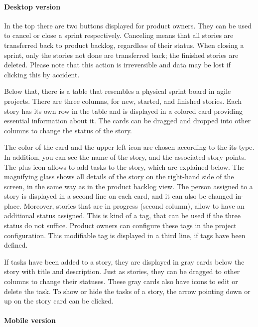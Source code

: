 \documentclass[
	accentcolor=tud1a %
]{tudreport}
\begin{document}
\paragraph{Desktop version}
In the top there are two buttons displayed for product owners. They can be used to cancel or close a sprint respectively. Canceling means that all stories are transferred back to product backlog, regardless of their status. When closing a sprint, only the stories not done are transferred back; the finished stories are deleted. Please note that this action is irreversible and data may be lost if clicking this by accident.

Below that, there is a table that resembles a physical sprint board in agile projects. There are three columns, for new, started, and finished stories. Each story has its own row in the table and is displayed in a colored card providing essential information about it. The cards can be dragged and dropped into other columns to change the status of the story.

The color of the card and the upper left icon are chosen according to the its type. In addition, you can see the name of the story, and the associated story points. The plus icon allows to add tasks to the story, which are explained below. The magnifying glass shows all details of the story on the right-hand side of the screen, in the same way as in the product backlog view. The person assigned to a story is displayed in a second line on each card, and it can also be changed in-place. Moreover, stories that are in progress (second column), allow to have an additional status assigned. This is kind of a tag, that can be used if the three status do not suffice. Product owners can configure these tags in the project configuration. This modifiable tag is displayed in a third line, if tags have been defined.

If tasks have been added to a story, they are displayed in gray cards below the story with title and description. Just as stories, they can be dragged to other columns to change their statuses. These gray cards also have icons to edit or delete the task. To show or hide the tasks of a story, the arrow pointing down or up on the story card can be clicked.

\paragraph{Mobile version}
\end{document}
